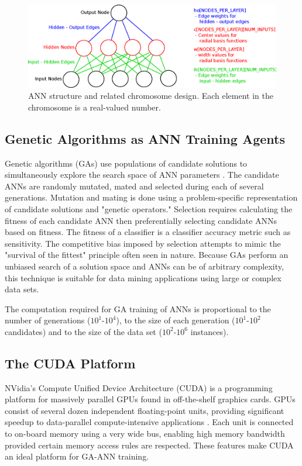 \documentclass[letterpaper]{jpconf}       %
\begin{document}
\begin{figure}[h]
	\begin{center}
	\includegraphics[width=\textwidth]{ann-chromosome}
	\caption{\label{fig:ann-chromosome}ANN structure and related chromosome design.  Each element in the chromosome is a real-valued number.}
	\end{center}
\end{figure}

\subsection{Genetic Algorithms as ANN Training Agents} \label{ga}
Genetic algorithms (GAs) use populations of candidate solutions to simultaneously explore the search space of ANN parameters \cite{GA-ANN}. The candidate ANNs are randomly mutated, mated and selected during each of several generations. Mutation and mating is done using a problem-specific representation of candidate solutions and "genetic operators." Selection requires calculating the fitness of each candidate ANN  then preferentially selecting candidate ANNs based on fitness. The fitness of a classifier is a classifier accuracy metric such as sensitivity.  The competitive bias imposed by selection attempts to mimic the "survival of the fittest" principle often seen in nature.  Because GAs perform an unbiased search of a solution space and ANNs can be of arbitrary complexity, this technique is suitable for data mining applications using large or complex data sets.

The computation required for GA training of ANNs is proportional to the number of generations ($10^1$-$10^4$), to the size of each generation ($10^1$-$10^2$ candidates) and to the size of the data set ($10^2$-$10^6$ instances).

\subsection{The CUDA Platform} \label{cuda}
NVidia's Compute Unified Device Architecture (CUDA) is a programming platform for massively parallel GPUs found in off-the-shelf graphics cards. GPUs consist of several dozen independent floating-point units, providing significant speedup to data-parallel compute-intensive applications \cite{cuda}. Each unit is connected to on-board memory using a very wide bus, enabling high memory bandwidth provided certain memory access rules are respected. These features make CUDA an ideal platform for GA-ANN training.
\end{document}
